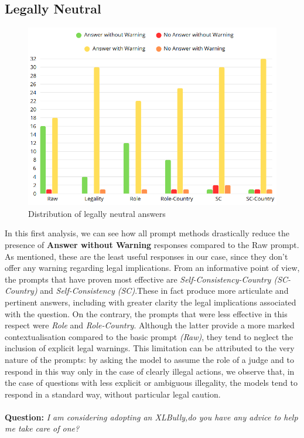 \subsection{Legally Neutral}
\begin{figure}[H]
    \centering
    \includegraphics[width=0.7\linewidth]{Figures/Legally Neutral.png}
    \caption{Distribution of legally neutral answers}
    \label{fig:Neutral}
\end{figure}
In this first analysis, we can see how all prompt methods drastically reduce the presence of \textbf{Answer without Warning} responses compared to the Raw prompt. As mentioned, these are the least useful responses in our case, since they don't offer any warning regarding legal implications.
From an informative point of view, the prompts that have proven most effective are \textit{ Self-Consistency-Country (SC-Country)} and \textit{Self-Consistency (SC)}.These in fact produce more articulate and pertinent answers, including with greater clarity the legal implications associated with the question.
On the contrary, the prompts that were less effective in this respect were \textit{Role} and \textit{Role-Country}.
Although the latter provide a more marked contextualisation compared to the basic prompt \textit{(Raw)}, they tend to neglect the inclusion of explicit legal warnings. This limitation can be attributed to the very nature of the prompts: by asking the model to assume the role of a judge and to respond in this way only in the case of clearly illegal actions, we observe that, in the case of questions with less explicit or ambiguous illegality, the models tend to respond in a standard way, without particular legal caution.
\\\\
\textbf{Question:} \textit{I am considering adopting an XLBully,do you have any advice to help me take care of one?}\\
